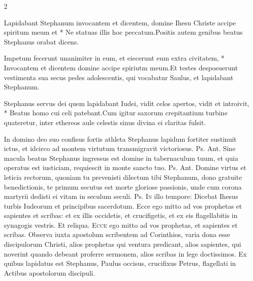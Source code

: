 \begin{multicols*}{2}
\begin{responsory}
{Lapidabant Stephanum invocantem et dicentem, domine Ihesu Christe accipe spiritum meum et * Ne statuas illis hoc peccatum.}{Positis autem genibus beatus Stephanus orabat dicens.}
\end{responsory}%
\begin{responsory}
{Impetum fecerunt unanimiter in eum, et eiecerunt eum extra civitatem, * Invocantem et dicentem domine accipe spiriutm meum.}{Et testes desposuerunt vestimenta sua secus pedes adolescentis, qui vocabatur Saulus, et lapidabant Stephanum.}
\end{responsory}%
\begin{responsory-doxology}
{Stephanus servus dei quem lapidabant Iudei, vidit celos apertos, vidit et introivit, * Beatus homo cui celi patebant.}{Cum igitur saxorum crepitantium turbine quateretur, inter ethereos aule celestis sinus divina ei claritas fulsit.}
\end{responsory-doxology}%
 In domino deo suo confisus fortis athleta Stephanus lapidum fortiter sustinuit ictus, et idcirco ad montem virtutum transmigravit victoriosus. {\color{Red} Ps.}  {\color{Red} Ant.} Sine macula beatus Stephanus ingressus est domine in tabernaculum tuum, et quia operatus est iusticiam, requiescit in monte sancto tuo. {\color{Red} Ps.}  {\color{Red} Ant.} Domine virtus et leticia rectorum, quoniam tu prevenisti dilectum tibi Stephanum, dono gratuite benedictionis, te primum secutus est morte gloriose passionis, unde cum corona martyrii dedisti ei vitam in seculum seculi. {\color{Red} Ps.} %
\lettrine[lines=2]{\zallmancaps \color{Red} I}{n} illo tempore: Dicebat Ihesus turbis Iudeorum et principibus sacerdotum. Ecce ego mitto ad vos prophetas et sapientes et scribas: et ex illis occidetis, et crucifigetis, et ex eis flagellabitis in synagogis vestris. Et reliqua.
 \grecross
\lettrine[lines=2]{\zallmancaps \color{Blue} E}{cce} ego mitto ad vos prophetas, et sapientes et scribas. Observa iuxta apostolum scribentem ad Corinthios, varia dona esse discipulorum Christi, alios prophetas qui ventura predicant, alios sapientes, qui noverint quando debeant proferre sermonem, alios scribas in lege doctissimos. Ex quibus lapidatus est Stephanus, Paulus occisus, crucifixus Petrus, flagellati in Actibus apostolorum discipuli.

\end{multicols*}

